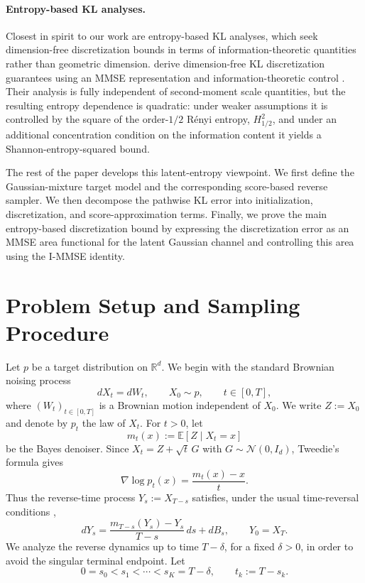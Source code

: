 \documentclass[11pt]{article}
\newcommand{\R}{\mathbb{R}}
\newcommand{\E}{\mathbb{E}}
\begin{document}
\paragraph{Entropy-based KL analyses.}
Closest in spirit to our work are entropy-based KL analyses, which seek
dimension-free discretization bounds in terms of information-theoretic
quantities rather than geometric dimension. \cite{aghapour2026entropy}
derive dimension-free KL discretization guarantees using an MMSE
representation and information-theoretic control
\cite{aghapour2026entropy}. Their analysis is fully independent of
second-moment scale quantities, but the resulting entropy dependence is
quadratic: under weaker assumptions it is controlled by the square of the
order-$1/2$ R\'enyi entropy, $H_{1/2}^2$, and under an additional
concentration condition on the information content it yields a
Shannon-entropy-squared bound.

The rest of the paper develops this latent-entropy viewpoint. We first define
the Gaussian-mixture target model and the corresponding score-based reverse
sampler. We then decompose the pathwise KL error into initialization,
discretization, and score-approximation terms. Finally, we prove the main
entropy-based discretization bound by expressing the discretization error as
an MMSE area functional for the latent Gaussian channel and controlling this
area using the I-MMSE identity.

\section{Problem Setup and Sampling Procedure}

Let $p$ be a target distribution on $\R^d$. We begin with the standard Brownian noising process
\[
    dX_t=dW_t,\qquad X_0\sim p,\qquad t\in[0,T],
\]
where $(W_t)_{t\in[0,T]}$ is a Brownian motion independent of $X_0$. We write $Z:=X_0$ and denote by $p_t$ the law of $X_t$. For $t>0$, let
\[
    m_t(x):=\E[Z\mid X_t=x]
\]
be the Bayes denoiser. Since $X_t=Z+\sqrt t\,G$ with $G\sim\mathcal N(0,I_d)$, Tweedie's formula gives
\[
    \nabla\log p_t(x)=\frac{m_t(x)-x}{t}.
\]
Thus the reverse-time process $Y_s:=X_{T-s}$ satisfies, under the usual time-reversal conditions \cite{haussmann1986time},
\[
    dY_s
    =
    \frac{m_{T-s}(Y_s)-Y_s}{T-s}\,ds+dB_s,
    \qquad
    Y_0=X_T .
\]
We analyze the reverse dynamics up to time $T-\delta$, for a fixed $\delta>0$, in order to avoid the singular terminal endpoint. Let
\[
    0=s_0<s_1<\cdots<s_K=T-\delta,
    \qquad
    t_k:=T-s_k .
\]
\end{document}
